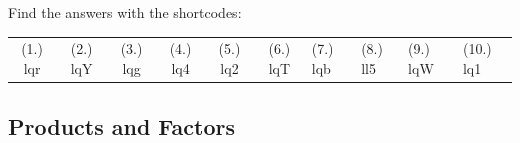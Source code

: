   \label{m38347**end}
\par {} Find the answers with the shortcodes:
 \par \begin{tabular}[h]{cccccc}
 (1.) lqr  &  (2.) lqY  &  (3.) lqg  &  (4.) lq4  &  (5.) lq2  &  (6.) lqT  &  (7.) lqb  &  (8.) ll5  &  (9.) lqW  &  (10.) lq1  & \end{tabular}
\subsection{Products and Factors}
            \nopagebreak
